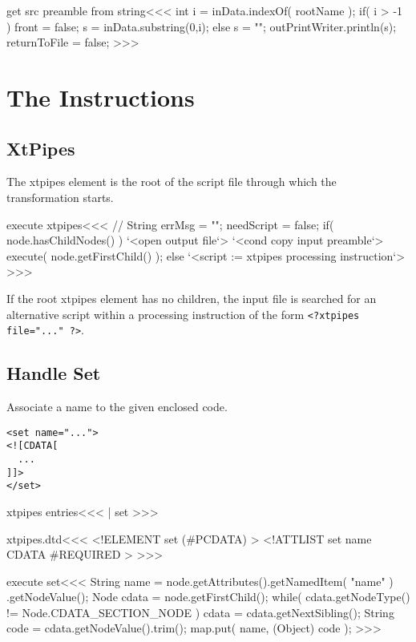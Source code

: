 \documentclass{article}
\begin{document}
{\<get src preamble from string\><<<
int i = inData.indexOf( rootName );
if( i > -1 ){
   front = false;
   s = inData.substring(0,i);
} else { s = ""; }
outPrintWriter.println(s);
returnToFile = false;
>>>




\section{The Instructions}



\subsection{XtPipes}

The xtpipes element is the root of the script file through which
the transformation starts.

\<execute xtpipes\><<<
// String errMsg = "";
needScript = false;
if( node.hasChildNodes() ){
  `<open output file`>
  `<cond copy input preamble`>
   execute( node.getFirstChild() );
} else {
   `<script := xtpipes processing instruction`>
}
>>>






If the root xtpipes element has no children, the input file is
searched for an alternative script within a processing instruction of
the form \verb+<?xtpipes file="..." ?>+.





\subsection{Handle Set}

Associate a name to the given enclosed  code.

\begin{verbatim}
<set name="...">
<![CDATA[
  ...
]]>
</set>
\end{verbatim}

\<xtpipes entries\><<<
| set
>>>

\<xtpipes.dtd\><<<
<!ELEMENT set (#PCDATA) >
<!ATTLIST set
          name CDATA #REQUIRED >
>>>





\<execute set\><<<
String name = node.getAttributes().getNamedItem( "name" )
                                  .getNodeValue();
Node cdata = node.getFirstChild();
while( cdata.getNodeType() != Node.CDATA_SECTION_NODE ){
   cdata = cdata.getNextSibling();
}
String code = cdata.getNodeValue().trim();
map.put( name, (Object) code );
>>>









}
\end{document}
